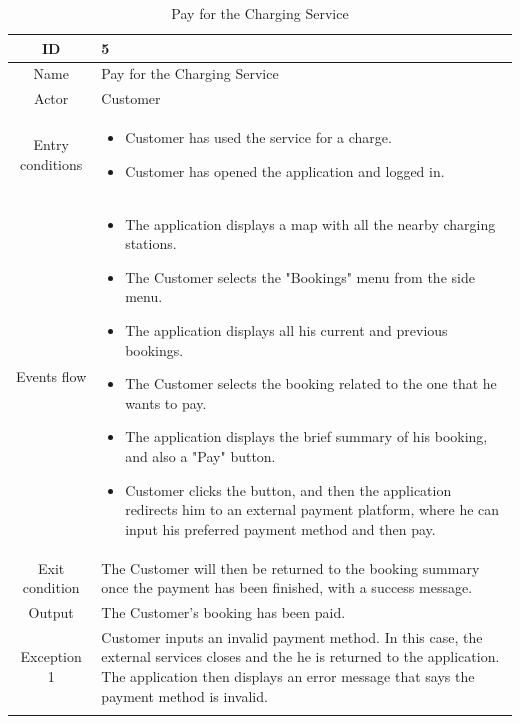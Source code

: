 \begin{longtable}{|c| p{10cm}|}
    \hline ID        & 5\\
    \hline
    Name     & Pay for the Charging Service \\
    \hline
    Actor            & Customer\\
    \hline
    Entry conditions & \begin{itemize}[nosep,after=\strut]
        \item Customer has used the service for a charge.
        \item Customer has opened the application and logged in.
    \end{itemize}
        \\
    \hline
    Events flow      & \begin{itemize}[nosep,after=\strut]
        \item The application displays a map with all the nearby charging stations.
        \item The Customer selects the "Bookings" menu from the side menu.
        \item The application displays all his current and previous bookings.
        \item The Customer selects the booking related to the one that he wants to pay.
        \item The application displays the brief summary of his booking, and also a "Pay" button.
        \item Customer clicks the button, and then the application redirects him to an external payment platform, where he can input his preferred payment method and then pay. 
    \end{itemize}\\
    \hline
    Exit condition   & The Customer will then be returned to the booking summary once the payment has been finished, with a success message.\\
    \hline
    Output           &  The Customer's booking has been paid.
    \\
    \hline
    \hline
    Exception 1      &  Customer inputs an invalid payment method. In this case, the external services closes and the he is returned to the application. The application then displays an error message that says the payment method is invalid. \\
    \hline
    \caption{Pay for the Charging Service}\\
\end{longtable}
